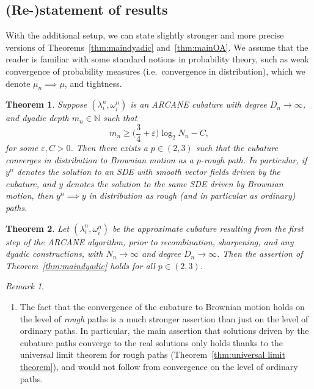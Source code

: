 \documentclass[11pt, letterpaper]{article}
\newtheorem{theorem}{Theorem}
\theoremstyle{definition}
\theoremstyle{remark}
\newtheorem{remark}{Remark}
\newcommand{\N}{\mathbb{N}}
\newenvironment{manualtheoremnumber}[1]{%
  \renewcommand\thetheorem{#1}%
}{}
\newcommand{\short}{ARCANE\xspace}
\begin{document}
\begin{appendices}
\subsection{(Re-)statement of results}
With the additional setup, we can state slightly stronger and more precise versions of Theorems~\ref{thm:maindyadic} and~\ref{thm:mainOA}. We assume that the reader is familiar with some standard notions in probability theory, such as weak convergence of probability measures (i.e.\ convergence in distribution), which we denote $\mu_n \implies \mu$, and tightness.
\begin{manualtheoremnumber}{\ref*{thm:maindyadic}*}
\begin{theorem}\label{thm:maindyadic-stronger}
    Suppose $(\lambda_i^n, \omega_i^n)$ is an \short cubature with degree $D_n \to \infty$, and dyadic depth $m_n \in \N$ such that \[
    m_n \ge \Big(\frac 34 + \varepsilon\Big) \log_2 N_n - C,
    \] for some $\varepsilon, C > 0$.
    Then there exists a $p \in (2,3)$ such that the cubature converges in distribution to Brownian motion as a $p$-rough path. In particular, if $y^n$ denotes the solution to an SDE with smooth vector fields driven by the cubature, and $y$ denotes the solution to the same SDE driven by Brownian motion, then $y^n \implies y$ in distribution as rough (and in particular as ordinary) paths.
\end{theorem}
\end{manualtheoremnumber}

\begin{manualtheoremnumber}{\ref*{thm:mainOA}*}
\begin{theorem}\label{thm:mainOA-stronger}
    Let $(\lambda_i^n,\omega_i^n)$ be the approximate cubature resulting from the first step of the \short algorithm, prior to recombination, sharpening, and any dyadic constructions, with $N_n \to \infty$ and degree $D_n \to \infty$. Then the assertion of Theorem~\ref{thm:maindyadic} holds for \emph{all} $p\in (2,3)$.
\end{theorem}
\end{manualtheoremnumber}

\begin{remark}
    \begin{enumerate}
        \item[(i)] The fact that the convergence of the cubature to Brownian motion holds on the level of \emph{rough} paths is a much stronger assertion than just on the level of ordinary paths. In particular, the main assertion that solutions driven by the cubature paths converge to the real solutions only holds thanks to the universal limit theorem for rough paths (Theorem~\ref{thm:universal limit theorem}), and would not follow from convergence on the level of ordinary paths.\medbreak
        

\end{enumerate}
\end{remark}
\end{appendices}
\end{document}
